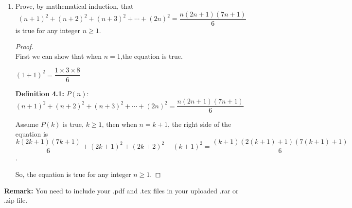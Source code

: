 \documentclass[12pt,a4paper]{article}
\theoremstyle{definition}
\begin{document}
\begin{enumerate}
\begin{proof}
\begin{center}
      When n=2, $a_2=2\le 2^{2}$.
    \end{center}
	Assume that $a_k\le 2^{k}$, then $a_{k+1}=a_k+a_{k-1}+a_{k-2}\le2^k+2^{k-1}+2^{k-2}\le2^k+2^{k-1}+2^{k-1}\le2^{k+1}$, so the assumption is true when $n=k+1$.
	
	Therefore, the assumption is true.
    \end{proof}

    \item
    Prove, by mathematical induction, that
    $$
    (n+1)^2+(n+2)^2+(n+3)^2+\cdots +(2n)^2=\dfrac{n(2n+1)(7n+1)}{6}
    $$
    is true for any integer $n\ge 1$.
    \begin{proof}
       ~\\
       First we can show that when $n=1$,the equation is true.
    \begin{center}
  		$(1+1)^2=\dfrac{1\times3\times8}{6}$
    \end{center}   
     \textbf{Definition 4.1: } $P(n)$: $(n+1)^2+(n+2)^2+(n+3)^2+\cdots +(2n)^2=\dfrac{n(2n+1)(7n+1)}{6}$
     
     Assume $P(k)$ is true, $k \ge 1$, then when $n=k+1$, the right side of the equation is $\dfrac{k(2k+1)(7k+1)}{6}+(2k+1)^2+(2k+2)^2-(k+1)^2=\dfrac{(k+1)(2(k+1)+1)(7(k+1)+1)}{6}$.
     
     So, the equation is true for any integer $n\ge1$.
    \end{proof}

\end{enumerate}

\vspace{20pt}

\textbf{Remark:} You need to include your .pdf and .tex files in your uploaded .rar or .zip file.

\end{document}
